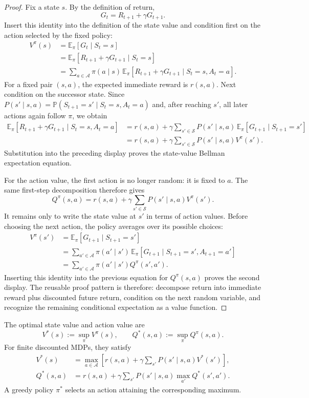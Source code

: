 \documentclass[11pt,a4paper]{article}
\theoremstyle{definition}
\begin{document}
\begin{proof}
Fix a state $s$. By the definition of return,
\[
G_t=R_{t+1}+\gamma G_{t+1}.
\]
Insert this identity into the definition of the state value and condition first on the
action selected by the fixed policy:
\[
\begin{aligned}
V^\pi(s)
&=\mathbb{E}_\pi[G_t\mid S_t=s]\\
&=\mathbb{E}_\pi[R_{t+1}+\gamma G_{t+1}\mid S_t=s]\\
&=\sum_{a\in\mathcal{A}}\pi(a\mid s)\,
\mathbb{E}_\pi[R_{t+1}+\gamma G_{t+1}\mid S_t=s,A_t=a].
\end{aligned}
\]
For a fixed pair $(s,a)$, the expected immediate reward is $r(s,a)$. Next condition on the
successor state. Since
$P(s'\mid s,a)=\mathbb{P}(S_{t+1}=s'\mid S_t=s,A_t=a)$ and, after reaching $s'$, all
later actions again follow $\pi$, we obtain
\[
\begin{aligned}
\mathbb{E}_\pi[R_{t+1}+\gamma G_{t+1}\mid S_t=s,A_t=a]
&=r(s,a)+\gamma\sum_{s'\in\mathcal{S}}
P(s'\mid s,a)\,
\mathbb{E}_\pi[G_{t+1}\mid S_{t+1}=s']\\
&=r(s,a)+\gamma\sum_{s'\in\mathcal{S}}
P(s'\mid s,a)V^\pi(s').
\end{aligned}
\]
Substitution into the preceding display proves the state-value Bellman expectation equation.

For the action value, the first action is no longer random: it is fixed to $a$. The same
first-step decomposition therefore gives
\[
Q^\pi(s,a)
=r(s,a)+\gamma\sum_{s'\in\mathcal{S}}
P(s'\mid s,a)V^\pi(s').
\]
It remains only to write the state value at $s'$ in terms of action values. Before choosing
the next action, the policy averages over its possible choices:
\[
\begin{aligned}
V^\pi(s')
&=\mathbb{E}_\pi[G_{t+1}\mid S_{t+1}=s']\\
&=\sum_{a'\in\mathcal{A}}\pi(a'\mid s')\,
\mathbb{E}_\pi[G_{t+1}\mid S_{t+1}=s',A_{t+1}=a']\\
&=\sum_{a'\in\mathcal{A}}\pi(a'\mid s')Q^\pi(s',a').
\end{aligned}
\]
Inserting this identity into the previous equation for $Q^\pi(s,a)$ proves the second
display. The reusable proof pattern is therefore: decompose return into immediate reward
plus discounted future return, condition on the next random variable, and recognize the
remaining conditional expectation as a value function.
\end{proof}

\begin{definition}\label{def:bellman-optimality}
The optimal state value and action value are
\[
V^*(s):=\sup_\pi V^\pi(s),
\qquad
Q^*(s,a):=\sup_\pi Q^\pi(s,a).
\]
For finite discounted MDPs, they satisfy
\[
\begin{aligned}
V^*(s)
&=\max_{a\in\mathcal{A}}
\left[r(s,a)+\gamma\sum_{s'}P(s'\mid s,a)V^*(s')\right],\\
Q^*(s,a)
&=r(s,a)+\gamma\sum_{s'}P(s'\mid s,a)
\max_{a'}Q^*(s',a').
\end{aligned}
\]
A greedy policy $\pi^*$ selects an action attaining the corresponding maximum.
\end{definition}
\end{document}
